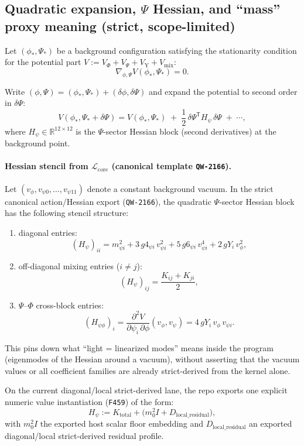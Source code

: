 \documentclass[11pt,a4paper]{article}
\begin{document}
\subsection{Quadratic expansion, $\Psi$ Hessian, and “mass” proxy meaning (strict, scope-limited)}

Let $(\phi_\ast,\Psi_\ast)$ be a background configuration satisfying the stationarity condition for the potential part
$V:=V_{\Phi}+V_{\Psi}+V_{\mathrm{Y}}+V_{\mathrm{mix}}$:
\[
\nabla_{\phi,\Psi} V(\phi_\ast,\Psi_\ast)=0.
\]

Write $(\phi,\Psi)=(\phi_\ast,\Psi_\ast)+(\delta\phi,\delta\Psi)$ and expand the potential to second order in $\delta\Psi$:
\[
V(\phi_\ast,\Psi_\ast+\delta\Psi)
=
V(\phi_\ast,\Psi_\ast)
\;+\;\frac12\,\delta\Psi^{\mathsf T} H_{\psi}\,\delta\Psi
\;+\;\cdots,
\]
where $H_{\psi}\in\mathbb{R}^{12\times 12}$ is the $\Psi$-sector Hessian block (second derivatives) at the background point.

\paragraph{Hessian stencil from $\mathcal{L}_{\mathrm{core}}$ (canonical template \texttt{QW-2166}).}
Let $(v_{\phi},v_{\psi 0},\dots,v_{\psi 11})$ denote a constant background vacuum.
In the strict canonical action/Hessian export (\texttt{QW-2166}), the quadratic $\Psi$-sector Hessian block has the following stencil structure:
\begin{enumerate}[label=\arabic*.]
  \item diagonal entries:
  \[
  (H_{\psi})_{ii}
  =
  m_{\psi i}^2
  +3\,g4_{\psi i}\,v_{\psi i}^2
  +5\,g6_{\psi i}\,v_{\psi i}^4
  +2\,gY_i\,v_{\phi}^2,
  \]
  \item off-diagonal mixing entries ($i\neq j$):
  \[
  (H_{\psi})_{ij}
  =
  \frac{K_{ij}+K_{ji}}{2},
  \]
  \item $\Psi$--$\Phi$ cross-block entries:
  \[
  (H_{\psi\phi})_{i}
  =
  \frac{\partial^2 V}{\partial \psi_i\,\partial \phi}(v_{\phi},v_{\psi})
  =
  4\,gY_i\,v_{\phi}\,v_{\psi i}.
  \]
\end{enumerate}
This pins down what “light = linearized modes” means inside the program (eigenmodes of the Hessian around a vacuum),
without asserting that the vacuum values or all coefficient families are already strict-derived from the kernel alone.

On the current diagonal/local strict-derived lane, the repo exports one explicit numeric value instantiation (\texttt{F459}) of the form:
\[
H_{\psi}
:=
K_{\mathrm{total}} + \bigl(m_0^2 I + D_{\mathrm{local\_residual}}\bigr),
\]
with $m_0^2 I$ the exported host scalar floor embedding and $D_{\mathrm{local\_residual}}$ an exported diagonal/local strict-derived residual profile.
\end{document}
